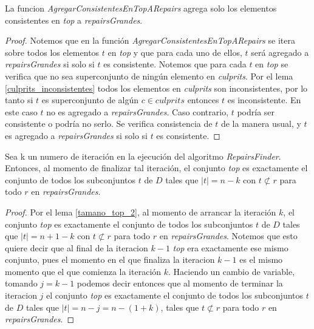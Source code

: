 \documentclass[11pt,a4paper,twoside]{tesis}
\begin{document}
\begin{lemma}\label{f_agregar_consistentes_en_top_a_repairs}
La funcion \textit{AgregarConsistentesEnTopARepairs} agrega solo los elementos consistentes en \textit{top} a \textit{repairsGrandes}.
\end{lemma}

\begin{proof}
Notemos que en la función  \textit{AgregarConsistentesEnTopARepairs} se itera sobre todos los elementos $t$ en \textit{top} y que para cada uno de ellos, $t$ será agregado a \textit{repairsGrandes} si solo si $t$ es consistente. Notemos que para cada $t$ en \textit{top} se verifica que no sea superconjunto de ningún elemento en \textit{culprits}. Por el lema  \ref{culprits_inconsistentes} todos los elementos en \textit{culprits} son inconsistentes, por lo tanto si $t$ es superconjunto de algún $c \in culprits$ entonces $t$ es inconsistente. En este caso $t$ no es agregado a \textit{repairsGrandes}. Caso contrario, $t$ podría ser consistente o podría no serlo. Se verifica consistencia de $t$ de la manera usual, y $t$ es agregado a \textit{repairsGrandes} si solo si $t$ es consistente.
\end{proof}

\begin{lemma}\label{fin_iteracion_k_top}
Sea k un numero de iteración en la ejecución del algoritmo \textit{RepairsFinder}. Entonces, al momento de finalizar tal iteración, el conjunto \textit{top} es exactamente el conjunto de todos los subconjuntos $t$ de $D$ tales que $|t|=n - k$ con $t \not\subset r$ para todo $r$ en \textit{repairsGrandes}.
\end{lemma}
\begin{proof}
Por el lema \ref{tamano_top_2}, al momento de arrancar la iteración $k$, el conjunto  \textit{top} es exactamente el conjunto de todos los subconjuntos $t$ de $D$ tales que $|t| = n + 1 - k$ con $t \not\subset r$ para todo $r$ en \textit{repairsGrandes}. Notemos que esto quiere decir que al final de la iteracion $k - 1$ \textit{top} era exactamente ese mismo conjunto, pues el momento en el que finaliza la iteracion $k - 1$ es el mismo momento que el que comienza la iteración $k$. Haciendo un cambio de variable, tomando $j = k -1$ podemos decir entonces que al momento de terminar la iteracion $j$ el conjunto \textit{top} es exactamente el conjunto de todos los subconjuntos $t$ de $D$ tales que $|t|=n - j = n - (1 + k)$, tales que $t \not\subset r$ para todo $r$ en \textit{repairsGrandes}.
\end{proof}
\end{document}
